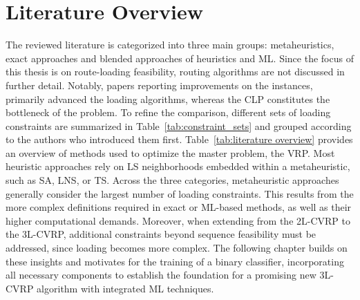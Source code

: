 \section{Literature Overview}
\label{sec:literature_overview}
The reviewed literature is categorized into three main groups: metaheuristics, exact approaches and blended approaches of heuristics and \gls{ML}.
Since the focus of this thesis is on route-loading feasibility, routing algorithms
are not discussed in further detail. Notably, papers reporting improvements on the \gendreauDataSetText instances, primarily
advanced the loading algorithms, whereas the \gls{CLP} constitutes the bottleneck of the problem. To refine the comparison,
different sets of loading constraints are summarized in Table~\ref{tab:constraint_sets}
and grouped according to the authors who introduced them first.
Table~\ref{tab:literature overview} provides an overview of methods used to optimize the master problem, the \gls{VRP}.
Most heuristic approaches rely on \gls{LS} neighborhoods embedded within a metaheuristic, such as \gls{SA}, \gls{LNS},
or \gls{TS}.
Across the three categories, metaheuristic approaches generally consider the largest number of loading constraints. This results
from the more complex definitions required in exact or \gls{ML}-based methods, as well as their higher computational demands.
Moreover, when extending from the \gls{2L-CVRP} to the \gls{3L-CVRP}, additional constraints beyond sequence feasibility must
be addressed, since loading becomes more complex.
The following chapter builds on these insights and motivates for the training of a binary classifier, incorporating all necessary
components to establish the foundation for a promising new \gls{3L-CVRP} algorithm with integrated \gls{ML} techniques.

